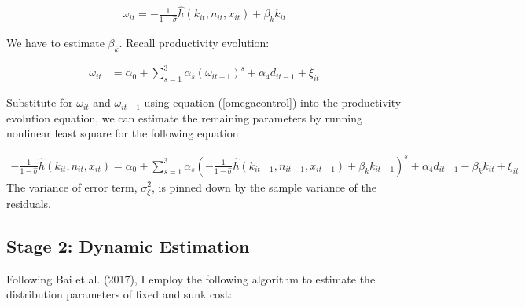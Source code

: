 \documentclass[11pt,letter]{article}
\newcommand{\prn}[1]{\left({#1}\right)}
\begin{document}
\begin{appendices}
\begin{align}
\omega_{it} = - \frac{1}{1-\hat{\sigma}} \hat{h}(k_{it},n_{it}, x_{it}) + \beta_k k_{it}\label{omegacontrol}
\end{align}

We have to estimate $\beta_k$. Recall productivity evolution:

\begin{align*}
\omega_{it} &= \alpha_0 + \sum_{s=1}^3 \alpha_s(\omega_{it-1})^s + \alpha_4 d_{it-1} + \xi_{it} 
\end{align*}

\noindent Substitute for $\omega_{it}$ and $\omega_{it-1}$ using equation (\ref{omegacontrol}) into the productivity evolution equation, we can estimate the remaining parameters by running nonlinear least square for the following equation:


\begin{align}
 - \frac{1}{1-\hat{\sigma}} \hat{h}(k_{it},n_{it}, x_{it})=  \alpha_0 + \sum_{s=1}^3 \alpha_s \prn{  - \frac{1}{1-\hat{\sigma}} \hat{h}(k_{it-1},n_{it-1}, x_{it-1}) + \beta_k k_{it-1} }^s + \alpha_4 d_{it-1} - \beta_k k_{it}  + \xi_{it} \label{prodest}
\end{align}
The variance of error term, $\sigma_\xi^2$, is pinned down by the sample variance of the residuals.

\subsection{Stage 2: Dynamic Estimation}\label{dynamicest}

Following Bai et al. (2017), I employ the following algorithm to estimate the distribution parameters of fixed and sunk cost:


\end{appendices}
\end{document}
